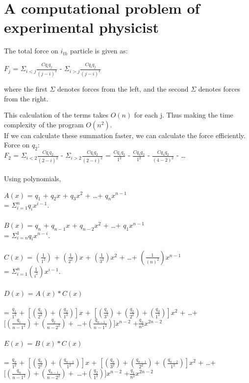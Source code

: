 \documentclass[pdftex,a4paper,12pt]{report}
\begin{document}
\section{A computational problem of experimental physicist}

The total force on $i_{th}$ particle is given as:
\begin{center}
$F_j$ = $\Sigma_{i<j} \frac{Cq_i q_j}{(j-i)^2}$ - $\Sigma_{i>j} \frac{Cq_i q_j}{(j-i)^2}$
\end{center}
where the first $\Sigma$ denotes forces from the left, and the second $\Sigma$ denotes forces from the right.

This calculation of the terms takes $O(n)$ for each j. Thus making the time complexity of the program $O(n^2)$.\\
If we can calculate these summation faster, we can calculate the force efficiently.\\
Force on $q_2$:\\
$F_2$ = $\Sigma_{i<2} \frac{Cq_i q_2}{(2-i)^2}$ - $\Sigma_{i>2} \frac{Cq_i q_2}{(2-i)^2}$
= $\frac{Cq_1 q_2}{1^2}$ - $\frac{Cq_3 q_2}{1^2}$ - $\frac{Cq_4 q_2}{(4-2)^2}$ - \ldots\\\\
Using polynomials,
\begin{center}
$A(x)$ = $q_1$ + $q_2 x$ + $q_3 x^2$ + \ldots + $q_n x^{n-1}$\\
= $\Sigma_{i=1}^{n} q_i x^{i-1}$.\\\makebox[2pt]{} \\

$B(x)$ = $q_n$ + $q_{n-1} x$ + $q_{n-2} x^2$ + \ldots + $q_1 x^{n-1}$\\
= $\Sigma_{i=n}^{1} q_i x^{n-i}$.\\\makebox[2pt]{} \\

$C(x)$ = $(\frac{1}{1^2})$ + $(\frac{1}{2^2}) x$ + $(\frac{1}{3^2}) x^2$ + \ldots + $(\frac{1}{(n)^2}) x^{n-1}$\\
= $\Sigma_{i=1}^{n} (\frac{1}{i^2}) x^{i-1}$.\\\makebox[2pt]{} \\

$D(x)$ = $A(x) * C(x)$ \\\makebox[2pt]{}\\ = $\frac{q_1}{1^2}$ + $[(\frac{q_1}{2^2})+(\frac{q_2}{1^2})] x$ + 
			     $[(\frac{q_1}{3^2}) + (\frac{q_2}{2^2}) + (\frac{q_3}{1^2})] x^2$ + \ldots + $[(\frac{q_1}{n-1^2})+(\frac{q_2}{n-2^2})+$ \ldots $+(\frac{q_{n-1}}{n-1^2})] x^{n-2}$
			     +$ \frac{q_n}{n^2} x^{2n-2}$\\\makebox[2pt]{}\\

$E(x)$ = $B(x) * C(x)$ \\\makebox[2pt]{}\\ = $\frac{q_n}{1^2}$ + $[(\frac{q_n}{2^2})+(\frac{q_{n-1}}{1^2})] x$ + 
			     $[(\frac{q_n}{3^2}) + (\frac{q_{n-1}}{2^2}) + (\frac{q_{n-2}}{1^2})] x^2$ + \ldots + $[(\frac{q_n}{n-1^2})+(\frac{q_{n-1}}{n-2^2})+$ \ldots $+(\frac{q_{2}}{1^2})] x^{n-2}$
			     +$ \frac{q_1}{n^2} x^{2n-2}$\\\makebox[2pt]{}\\

\end{center}
\end{document}
